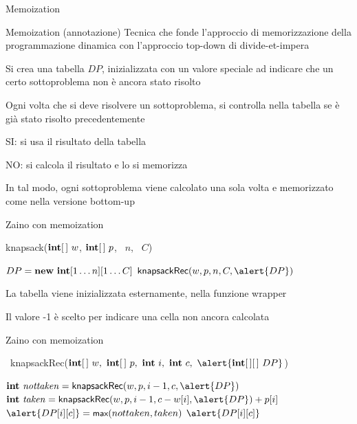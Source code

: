 \begin{frame}{Memoization}

\begin{block}{Memoization (annotazione)}
Tecnica che fonde l'approccio di memorizzazione della programmazione dinamica con l'approccio top-down di divide-et-impera
\end{block}

\BIL
\item Si crea una tabella $DP$, inizializzata con un \alert{valore speciale} ad 
indicare che un certo sottoproblema non è ancora stato risolto
\item Ogni volta che si deve risolvere un sottoproblema, si controlla nella tabella se è già stato risolto precedentemente
\BI
\item SI:  si usa il risultato della tabella
\item NO:  si calcola il risultato e lo si memorizza
\EI
\item In tal modo, ogni sottoproblema viene calcolato una sola volta e memorizzato come nella versione bottom-up
\EIL

\end{frame}

\begin{frame}{Zaino con memoization}

\vspace{-12pt}
\begin{Procedure}
\caption[A]{\textsf{knapsack}($\INTEGER[\,]\ w$, $\INTEGER[\,]\ p$, \INTEGER\ $n$, \INTEGER\ $C$)}
\alert{$DP = \NEW\ \INTEGER[1 \ldots n][1 \ldots C]$\;
}
\Return $\textsf{knapsackRec}(w, p, n, C, \alert{DP})$
\end{Procedure}

\BIL
\item La tabella viene inizializzata esternamente, nella funzione wrapper
\item Il valore -1 è scelto per indicare una cella non ancora calcolata
\EIL

\end{frame}

\begin{frame}{Zaino con memoization}

\begin{Procedure}
\caption[A]{\INTEGER\ \textsf{knapsackRec}($\INTARRAY\ w,\ \INTARRAY\ p,\  \INTEGER\ i,\ \INTEGER\ c,\ \alert{\INTARRAY[\,]\ DP}$)}

{
  $\INTEGER\ \mathit{nottaken} = \textsf{knapsackRec}(w,p, i-1, c, \alert{DP})$\;
  $\INTEGER\ \mathit{taken} = \textsf{knapsackRec}(w,p,i-1,c-w[i], \alert{DP})+p[i]$\;
  $\alert{DP[i][c]} = \MAX(nottaken, taken)$\;
}
\Return $\alert{DP[i][c]}$\;
\end{Procedure}

\end{frame}



